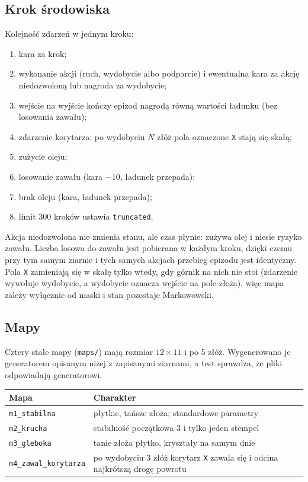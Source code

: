 \documentclass[11pt,a4paper]{article}
\begin{document}
\subsection{Krok środowiska}
Kolejność zdarzeń w jednym kroku:
\begin{enumerate}
  \item kara za krok;
  \item wykonanie akcji (ruch, wydobycie albo podparcie) i ewentualna kara za
  akcję niedozwoloną lub nagroda za wydobycie;
  \item wejście na wyjście kończy epizod nagrodą równą wartości ładunku
  (bez losowania zawału);
  \item zdarzenie korytarza: po wydobyciu $N$ złóż pola oznaczone \texttt{X}
  stają się skałą;
  \item zużycie oleju;
  \item losowanie zawału (kara $-10$, ładunek przepada);
  \item brak oleju (kara, ładunek przepada);
  \item limit 300 kroków ustawia \texttt{truncated}.
\end{enumerate}
Akcja niedozwolona nie zmienia stanu, ale czas płynie: zużywa olej i niesie
ryzyko zawału. Liczba losowa do zawału jest pobierana w każdym kroku, dzięki czemu
przy tym samym ziarnie i tych samych akcjach przebieg epizodu jest identyczny.
Pola \texttt{X} zamieniają się w skałę tylko wtedy, gdy górnik na nich nie stoi
(zdarzenie wywołuje wydobycie, a wydobycie oznacza wejście na pole złoża), więc
mapa zależy wyłącznie od maski i stan pozostaje Markowowski.

\subsection{Mapy}
Cztery stałe mapy (\texttt{maps/}) mają rozmiar $12\times 11$ i po 5 złóż.
Wygenerowano je generatorem opisanym niżej z zapisanymi ziarnami, a test sprawdza,
że pliki odpowiadają generatorowi.
\begin{center}
\begin{tabular}{@{}lp{}@{}}
\toprule
Mapa & Charakter \\
\midrule
\texttt{m1\_stabilna} & płytkie, tańsze złoża; standardowe parametry \\
\texttt{m2\_krucha} & stabilność początkowa 3 i tylko jeden stempel \\
\texttt{m3\_gleboka} & tanie złoża płytko, kryształy na samym dnie \\
\texttt{m4\_zawal\_korytarza} & po wydobyciu 3 złóż korytarz \texttt{X} zawala się
i odcina najkrótszą drogę powrotu \\
\bottomrule
\end{tabular}
\end{center}
\end{document}
